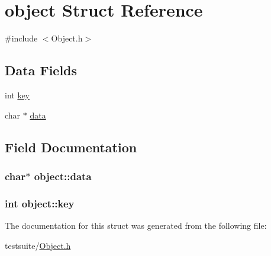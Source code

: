 \hypertarget{structobject}{\section{object Struct Reference}
\label{structobject}
}


{\ttfamily \#include $<$Object.\-h$>$}

\subsection*{Data Fields}
\begin{DoxyCompactItemize}
\item 
int \hyperlink{structobject_a8b7ebbdba2d1901d446969bc8dd20fa8}{key}
\item 
char $\ast$ \hyperlink{structobject_aef6498dcf3eee61396c1c5a6f7249659}{data}
\end{DoxyCompactItemize}


\subsection{Field Documentation}
\hypertarget{structobject_aef6498dcf3eee61396c1c5a6f7249659}{
\subsubsection[{data}]{\setlength{\rightskip}{0pt plus 5cm}char$\ast$ object\-::data}}\label{structobject_aef6498dcf3eee61396c1c5a6f7249659}
\hypertarget{structobject_a8b7ebbdba2d1901d446969bc8dd20fa8}{
\subsubsection[{key}]{\setlength{\rightskip}{0pt plus 5cm}int object\-::key}}\label{structobject_a8b7ebbdba2d1901d446969bc8dd20fa8}


The documentation for this struct was generated from the following file\-:\begin{DoxyCompactItemize}
\item 
testsuite/\hyperlink{Object_8h}{Object.\-h}\end{DoxyCompactItemize}
